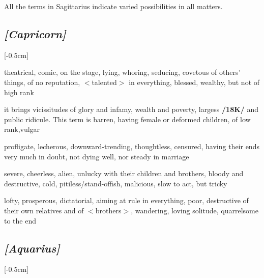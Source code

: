 \mndl[0.2cm]
All the terms in Sagittarius indicate varied possibilities in all matters.

\subsection{\textit{[Capricorn]}}
\marginnote{\Capricorn}[-0.5cm]
\vspace{-1mm}

\begin{description}[labelindent=0em , labelwidth=1em, labelsep=1em, leftmargin =!]
\item[\Mercury]
	[0-6] theatrical, comic, on the stage, lying, whoring,
seducing, covetous of others’ things, of no reputation, $<$talented$>$ in everything, blessed, wealthy, but not of high rank
\item[\Jupiter]
	[7-13] it brings vicissitudes of glory and infamy, wealth and poverty,
largess \textbf{/18K/} and public ridicule. This term is barren, having female or deformed children, of low rank,vulgar
\item[\Venus]
	[14-21] profligate, lecherous, downward-trending, thoughtless, censured, having their ends very much in doubt, not dying well, nor steady in marriage
\item[\Saturn]
	[22-25] severe, cheerless, alien, unlucky with their children and brothers, bloody and destructive, cold, pitiless/stand-offish, malicious, slow to act, but tricky	
\item[\Mars]
	[26-29] lofty, prosperous, dictatorial, aiming at rule in everything, poor, destructive of their own relatives and of
$<$brothers$>$, wandering, loving solitude, quarrelsome to the end
\end{description}

\subsection{\textit{[Aquarius]}}
\marginnote{\Aquarius}[-0.5cm]
\vspace{-1mm}

